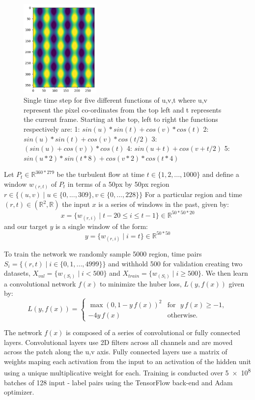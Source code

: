 \documentclass[10pt,letterpaper]{article}
\begin{document}
\begin{figure}
\begin{center}
		\includegraphics[width=0.35\textwidth]{images/sin_data_4.PNG}
		\caption{\small Single time step for five different functions of u,v,t where u,v represent the pixel co-ordinates from the top left and t represents the current frame. Starting at the top, left to right the functions respectively are: 
			1: $sin(u) * sin(t) + cos(v) * cos(t)$
			2: $sin(u) * sin(t) + cos(v) * cos(t/2)$
			3: $(sin(u) + cos(v)) * cos(t)$
			4: $sin(u + t) + cos(v + t / 2)$
			5: $sin(u*2) * sin(t*8) + cos(v*2) * cos(t*4)$}	
		\label{training}
	\end{center}	
\end{figure}



Let $P_t \in \mathbb{R}^{360*279} $ be the turbulent flow at time $t \in \{1, 2, ..., 1000\}$ and define a window $w_{(r, t)}$ of $P_t$ in terms of a 50px by 50px region $r \in \{(u,v) \mid u \in \{0, ..., 309\}, v \in \{0, ...,  228\}\}$ 
For a particular region and time $(r,t) \in (\mathbb{R}^2,\mathbb{R})$ the input $x$ is a series of windows in the past, given by:
 $$x = \{w_{(r,i)} \mid t-20 \leq i \leq t-1 \} \in \mathbb{R}^{50*50*20}$$ and our target $y$ is a single window of the form: $$y = \{w_{(r,i)} \mid i = t  \} \in \mathbb{R}^{50*50}$$

To train the network we randomly sample 5000 region, time pairs $S_i = \{(r, t) \mid i \in \{0, 1, ..., 4999\} \}$ and withhold 500 for validation creating two datasets, $X_{val} = \{w_{(S_i)} \mid i < 500 \} $ and $X_{train} = \{ {w_{(S_i)}\mid i \geq 500} \}$. We then learn a convolutional network $f(x)$ to minimize the huber loss, $L(y, f(x))$ given by:
$$L(y, f(x)) = \begin{cases}
	\max(0, 1 - y \, f(x))^2 & \textrm{for }\, \,  y \, f(x) \ge -1, \\
	-4y \, f(x)              & \textrm{otherwise.}
\end{cases}$$

The network $f(x)$ is composed of a series of convolutional or fully connected layers. Convolutional layers use 2D filters across all channels and are moved across the patch along the u,v axis. Fully connected layers use a matrix of weights maping each activation from the input to an activation of the hidden unit using a unique multiplicative weight for each. Training is conducted over \num{5e+8} batches of 128 input - label pairs using the TensorFlow back-end and Adam optimizer.
\end{document}
